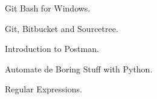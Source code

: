 {\faCertificate \color{emphasis} \hspace{2mm} Git Bash for Windows.}

{\faCertificate \color{emphasis} \hspace{2mm} Git, Bitbucket and Sourcetree.}

{\faCertificate \color{emphasis} \hspace{2mm} Introduction to Postman.}

{\faCertificate \color{emphasis} \hspace{2mm} Automate de Boring Stuff with Python.}

{\faCertificate \color{emphasis} \hspace{2mm} Regular Expressions.}

 


%
